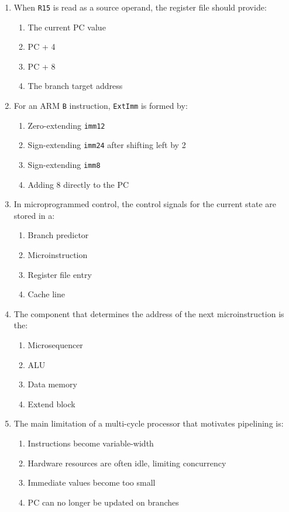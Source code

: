 \documentclass[11pt]{article}
\begin{document}
\begin{enumerate}[label=\textbf{A\arabic*.}]
  \item When \texttt{R15} is read as a source operand, the register file should provide:
  \begin{enumerate}[label=(\Alph*)]
    \item The current PC value
    \item PC + 4
    \item PC + 8
    \item The branch target address
  \end{enumerate}

  \item For an ARM \texttt{B} instruction, \texttt{ExtImm} is formed by:
  \begin{enumerate}[label=(\Alph*)]
    \item Zero-extending \texttt{imm12}
    \item Sign-extending \texttt{imm24} after shifting left by 2
    \item Sign-extending \texttt{imm8}
    \item Adding 8 directly to the PC
  \end{enumerate}

  \item In microprogrammed control, the control signals for the current state are stored in a:
  \begin{enumerate}[label=(\Alph*)]
    \item Branch predictor
    \item Microinstruction
    \item Register file entry
    \item Cache line
  \end{enumerate}

  \item The component that determines the address of the next microinstruction is the:
  \begin{enumerate}[label=(\Alph*)]
    \item Microsequencer
    \item ALU
    \item Data memory
    \item Extend block
  \end{enumerate}

  \item The main limitation of a multi-cycle processor that motivates pipelining is:
  \begin{enumerate}[label=(\Alph*)]
    \item Instructions become variable-width
    \item Hardware resources are often idle, limiting concurrency
    \item Immediate values become too small
    \item PC can no longer be updated on branches
  \end{enumerate}


\end{enumerate}
\end{document}
